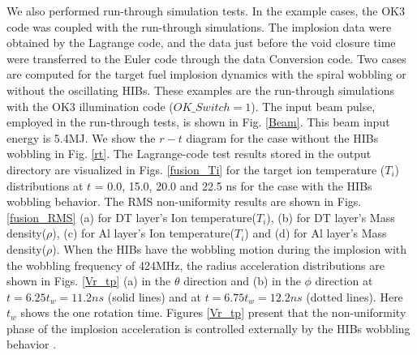 We also performed run-through simulation tests. In the example cases, the OK3 code was coupled with the run-through simulations. The implosion data were obtained by the Lagrange code, and the data just before the void closure time were transferred to the Euler code through the data Conversion code. Two cases are computed for the target fuel implosion dynamics with the spiral wobbling or without the oscillating HIBs. These examples are the run-through simulations with the OK3 illumination code ($OK\_Switch = 1$). The input beam pulse, employed in the run-through tests, is shown in Fig. \ref {Beam}. This beam input energy is 5.4MJ. We show the $r-t$ diagram for the case without the HIBs wobbling in Fig. \ref{rt}. The Lagrange-code test results stored in the output directory are visualized in Figs. \ref {fusion_Ti} for the target ion temperature ($T_i$) distributions at $t$ = 0.0, 15.0, 20.0 and 22.5 ns for the case with the HIBs wobbling behavior.  The RMS non-uniformity results are shown in Figs. \ref{fusion_RMS} (a) for DT layer's Ion temperature($T_i$), (b) for DT layer's Mass density($\rho$), (c) for Al layer's Ion temperature($T_i$) and (d) for Al layer's Mass density($\rho$). 
%
When the HIBs have the wobbling motion during the implosion with the wobbling frequency of 424MHz, the radius acceleration distributions are shown in Figs. \ref{Vr_tp} (a) in the $\theta$ direction and (b) in the $\phi$ direction at $t=6.25t_w=11.2ns$ (solid lines) and at $t=6.75t_w=12.2ns$ (dotted lines). Here $t_w$ shows the one rotation time. Figures \ref{Vr_tp} present that the non-uniformity phase of the implosion acceleration is controlled externally by the HIBs wobbling behavior \cite{CPC-O-SUKI, RSato2}.  
%

